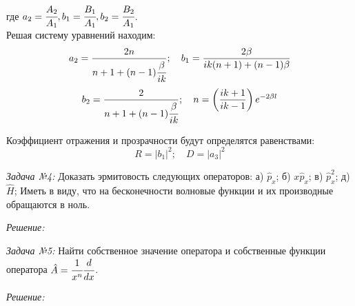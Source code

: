 где 
\( 
	a_2 = \cfrac{A_2}{A_1}, b_1 = \cfrac{B_1}{A_1}, b_2 = \cfrac{B_2}{A_1} 
\). \\

Решая систему уравнений находим:
\[
	a_2 = \frac{2n}{n+1+(n-1)\cfrac{\beta}{ik}};\quad
	b_1 = \frac{2\beta}{ik(n+1)+(n-1)\beta}
\]
\[
	b_2 = \frac{2}{n+1+(n-1)\cfrac{\beta}{ik}};\quad
	n = \left( \frac{ik+1}{ik-1}\right)e^{-2\beta l}
\]

Коэффициент отражения и прозрачности будут определятся равенствами:
\[
	R = \vert b_1 \vert ^2;\quad
	D = \vert a_3 \vert ^2
\]

\pagebreak

\emph{Задача №4:} Доказать эрмитовость следующих операторов: 
а) \( \hat{p}_x \);
б) \( x\hat{p}_x \);
в) \( \hat{p}^2_x \);
д) \( \hat{H} \);
Иметь в виду, что на бесконечности волновые функции и их производные обращаются 
в ноль.

\emph{Решение:}

\pagebreak

\emph{Задача №5:} Найти собственное значение оператора и собственные функции 
оператора \( \hat{A} = \cfrac{1}{x^n}\cfrac{d}{dx} \).

\emph{Решение:}



